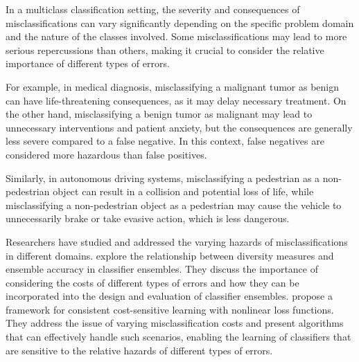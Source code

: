 In a multiclass classification setting, the severity and consequences of misclassifications can vary significantly depending on the specific problem domain and the nature of the classes involved. Some misclassifications may lead to more serious repercussions than others, making it crucial to consider the relative importance of different types of errors.

For example, in medical diagnosis, misclassifying a malignant tumor as benign can have life-threatening consequences, as it may delay necessary treatment. On the other hand, misclassifying a benign tumor as malignant may lead to unnecessary interventions and patient anxiety, but the consequences are generally less severe compared to a false negative. In this context, false negatives are considered more hazardous than false positives.

Similarly, in autonomous driving systems, misclassifying a pedestrian as a non-pedestrian object can result in a collision and potential loss of life, while misclassifying a non-pedestrian object as a pedestrian may cause the vehicle to unnecessarily brake or take evasive action, which is less dangerous.

Researchers have studied and addressed the varying hazards of misclassifications in different domains. \cite{kuncheva2006measures} explore the relationship between diversity measures and ensemble accuracy in classifier ensembles. They discuss the importance of considering the costs of different types of errors and how they can be incorporated into the design and evaluation of classifier ensembles.
\cite{mozannar2020consistent} propose a framework for consistent cost-sensitive learning with nonlinear loss functions. They address the issue of varying misclassification costs and present algorithms that can effectively handle such scenarios, enabling the learning of classifiers that are sensitive to the relative hazards of different types of errors.


